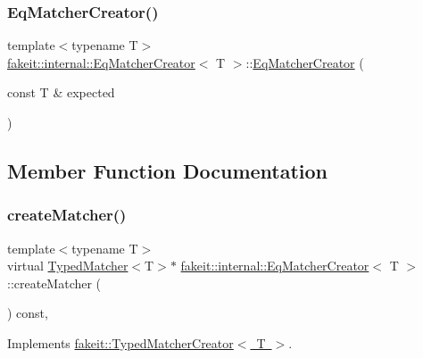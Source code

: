 \subsubsection{\texorpdfstring{EqMatcherCreator()}{EqMatcherCreator()}\hspace{0.1cm}{\footnotesize\ttfamily [9/9]}}
{\footnotesize\ttfamily template$<$typename T$>$ \\
\mbox{\hyperlink{structfakeit_1_1internal_1_1EqMatcherCreator}{fakeit\+::internal\+::\+Eq\+Matcher\+Creator}}$<$ T $>$\+::\mbox{\hyperlink{structfakeit_1_1internal_1_1EqMatcherCreator}{Eq\+Matcher\+Creator}} (\begin{DoxyParamCaption}\item[{const T \&}]{expected }\end{DoxyParamCaption})\hspace{0.3cm}{\ttfamily [inline]}}



\subsection{Member Function Documentation}
\mbox{\label{structfakeit_1_1internal_1_1EqMatcherCreator_a0ab880ca3aa803487b6cbb418bc2ccfc}} 
\subsubsection{\texorpdfstring{createMatcher()}{createMatcher()}\hspace{0.1cm}{\footnotesize\ttfamily [1/9]}}
{\footnotesize\ttfamily template$<$typename T$>$ \\
virtual \mbox{\hyperlink{structfakeit_1_1TypedMatcher}{Typed\+Matcher}}$<$T$>$$\ast$ \mbox{\hyperlink{structfakeit_1_1internal_1_1EqMatcherCreator}{fakeit\+::internal\+::\+Eq\+Matcher\+Creator}}$<$ T $>$\+::create\+Matcher (\begin{DoxyParamCaption}{ }\end{DoxyParamCaption}) const\hspace{0.3cm}{\ttfamily [inline]}, {\ttfamily [virtual]}}



Implements \mbox{\hyperlink{structfakeit_1_1TypedMatcherCreator_a40646cd11f8acf5c34b971f396891d5c}{fakeit\+::\+Typed\+Matcher\+Creator$<$ T $>$}}.

